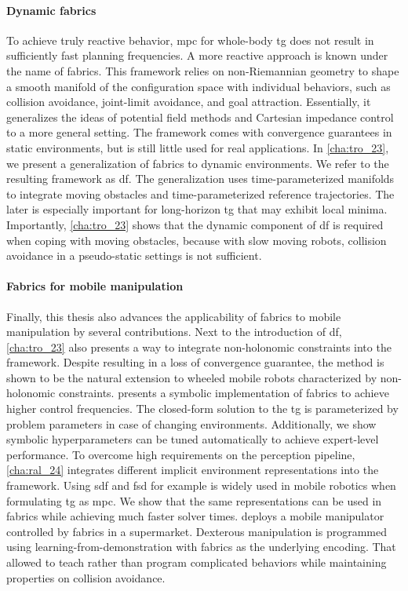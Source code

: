 \paragraph{Dynamic fabrics}
To achieve truly reactive behavior, \ac{mpc} for whole-body \ac{tg} does not
result in sufficiently fast planning frequencies. A more reactive approach is
known under the name of \ac{fabrics}. This framework relies on non-Riemannian
geometry to shape a smooth manifold of the configuration space with individual
behaviors, such as collision avoidance, joint-limit avoidance, and goal 
attraction. Essentially, it generalizes the ideas of potential field methods
and Cartesian impedance control to a more general setting. The framework comes
with convergence guarantees in static environments, but is still little used
for real applications. In \cref{cha:tro_23}, we present a generalization of
\ac{fabrics} to dynamic environments. We refer to the resulting framework as
\ac{df}. The generalization uses time-parameterized manifolds to integrate 
moving obstacles and time-parameterized reference trajectories. The later is
especially important for long-horizon \ac{tg} that may exhibit local minima.
Importantly, \cref{cha:tro_23} shows that the dynamic component of \ac{df}
is required when coping with moving obstacles, because with slow moving robots,
collision avoidance in a pseudo-static settings is not sufficient.

\paragraph{Fabrics for mobile manipulation}
Finally, this thesis also advances the applicability of \ac{fabrics} to mobile
manipulation by several contributions. 
Next to the introduction of \ac{df}, \cref{cha:tro_23} also presents a way to
integrate non-holonomic constraints into the framework. Despite resulting in a
loss of convergence guarantee, the method is shown to be the natural extension
to wheeled mobile robots characterized by non-holonomic constraints.
 presents a symbolic
implementation of \ac{fabrics} to achieve higher control frequencies. The
closed-form solution to the \ac{tg} is parameterized by problem parameters in
case of changing environments. Additionally, we show symbolic 
hyperparameters can be tuned automatically to achieve expert-level performance.
To overcome high requirements on the perception pipeline, \cref{cha:ral_24}
integrates different implicit environment representations into the framework.
Using \acf{sdf} and \acf{fsd} for example is widely used in mobile robotics when
formulating \ac{tg} as \ac{mpc}. We show that the same representations can be
used in \ac{fabrics} while achieving much faster solver times.
 deploys a mobile manipulator controlled by \ac{fabrics}
in a supermarket. Dexterous manipulation is programmed using
learning-from-demonstration with \ac{fabrics} as the underlying encoding.
That allowed to teach rather than program complicated behaviors while
maintaining properties on collision avoidance.

